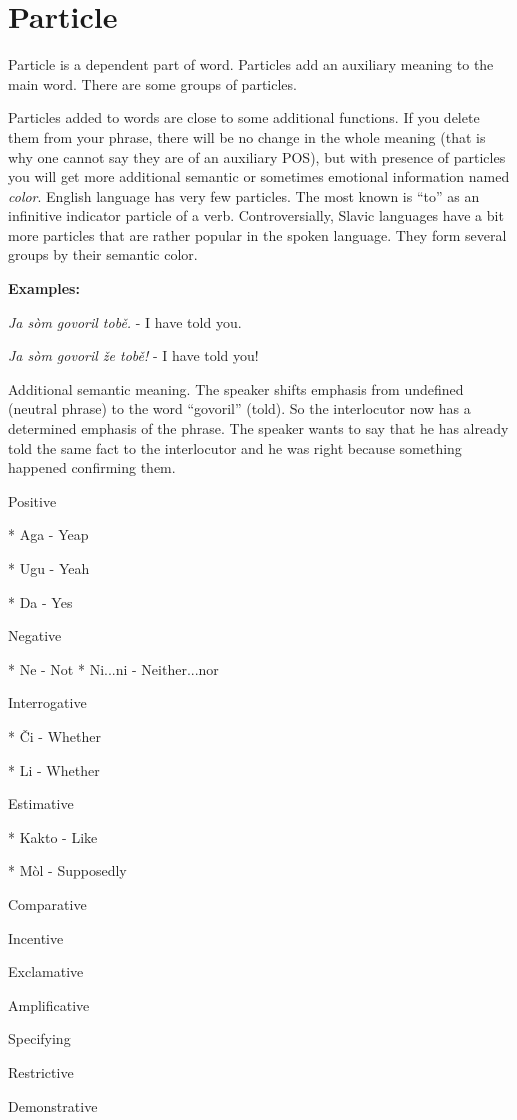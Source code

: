 \section{Particle}

Particle is a dependent part of word. Particles add an auxiliary meaning to the main word. There are some groups of particles.

Particles added to words are close to some additional functions. If you delete them from your phrase, there will be no change in the whole meaning (that is why one cannot say they are of an auxiliary POS), but with presence of particles you will get more additional semantic or sometimes emotional information named \textit{color}. English language has very few particles. The most known is “to” as an infinitive indicator particle of a verb. Controversially, Slavic languages have a bit more particles that are rather popular in the spoken language. They form several groups by their semantic color.

\textbf{Examples:}

\textit{Ja sòm govoril tobě.} - I have told you.

\textit{Ja sòm govoril že tobě!} - I have told you!

Additional semantic meaning. The speaker shifts emphasis from undefined (neutral phrase) to the word “govoril” (told). So the interlocutor now has a determined emphasis of the phrase. The speaker wants to say that he has already told the same fact to the interlocutor and he was right because something happened confirming them.

Positive

* Aga - Yeap

* Ugu - Yeah

* Da - Yes

Negative

* Ne - Not
* Ni...ni - Neither...nor

Interrogative

* Či - Whether

* Li - Whether

Estimative

* Kakto - Like

* Mòl - Supposedly

Comparative

Incentive

Exclamative

Amplificative


Specifying

Restrictive

Demonstrative


